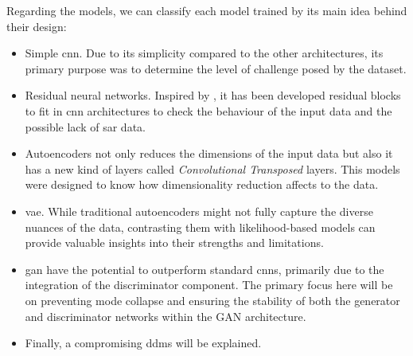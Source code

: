 
Regarding the models, we can classify each model trained by its main idea behind their design:
\begin{itemize}
	\item Simple \gls{cnn}. Due to its simplicity compared to the other architectures, its primary purpose was to determine the level of challenge posed by the dataset.
	\item Residual neural networks. Inspired by \cite{Meraner2020}, it has been developed residual blocks to fit in \gls{cnn} architectures to check the behaviour of the input data and the possible lack of \gls{sar} data.
	\item Autoencoders not only reduces the dimensions of the input data but also it has a new kind of layers called \textit{Convolutional Transposed} layers. This models were designed to know how dimensionality reduction affects to the data.
	\item \gls{vae}. While traditional autoencoders might not fully capture the diverse nuances of the data, contrasting them with likelihood-based models can provide valuable insights into their strengths and limitations.
	\item \gls{gan} have the potential to outperform standard \gls{cnn}s, primarily due to the integration of the discriminator component. The primary focus here will be on preventing mode collapse and ensuring the stability of both the generator and discriminator networks within the GAN architecture.
	\item Finally, a compromising \gls{ddm}s will be explained.
\end{itemize}
